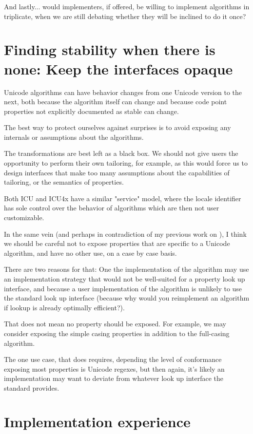 \documentclass{wg21}
\begin{document}
And lastly... would implementers, if offered, be willing to implement
algorithms in triplicate, when we are still debating whether they will be inclined to do it once?

\section{Finding stability when there is none: Keep the interfaces opaque}

Unicode algorithms can have behavior changes from one Unicode version to the next, both because the algorithm itself can change and because code point properties not explicitly documented as stable can change.

The best way to protect ourselves against surprises is to avoid
exposing any internals or assumptions about the algorithms.

The transformations are best left as a black box. We should not give users the opportunity to perform their own tailoring, for example, as this would force us to design interfaces that make too many assumptions about the capabilities of tailoring, or the semantics of properties.

Both ICU and ICU4x have a similar "service" model, where the locale identifier has sole control over the behavior of algorithms which are then not user customizable.

In the same vein (and perhaps in contradiction of my previous work on ), I think we should be careful not to expose properties
that are specific to a Unicode algorithm, and have no other use, on a case by case basis.

There are two reasons for that: One the implementation of the algorithm may use an implementation strategy that
would not be well-suited for a property look up interface, and because a user implementation of the algorithm
is unlikely to use the standard look up interface (because why would you reimplement an algorithm if lookup is already optimally efficient?).

That does not mean no property should be exposed. For example, we may consider exposing the simple casing properties
in addition to the full-casing algorithm.

The one use case, that does requires, depending the level of conformance exposing most properties is Unicode regexes,
but then again, it's likely an implementation may want to deviate from whatever look up interface the standard provides.

\section{Implementation experience}
\end{document}
